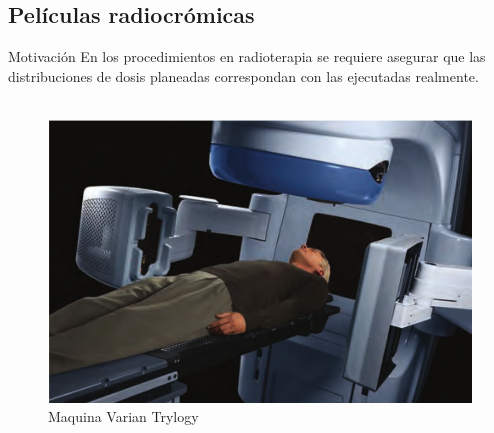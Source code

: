 \documentclass[12pt]{beamer}
\begin{document}
\subsection{Películas radiocrómicas}
\begin{frame}{Motivación}
En los procedimientos en radioterapia se requiere asegurar que las distribuciones de dosis planeadas correspondan con las ejecutadas realmente.  \\~\\

\begin{figure}
	\centering
	\includegraphics[width=0.7\linewidth]{images/paciente.png}
	\caption{Maquina Varian Trylogy \cite{khan2014the}}
\end{figure}

\end{frame}
\end{document}
